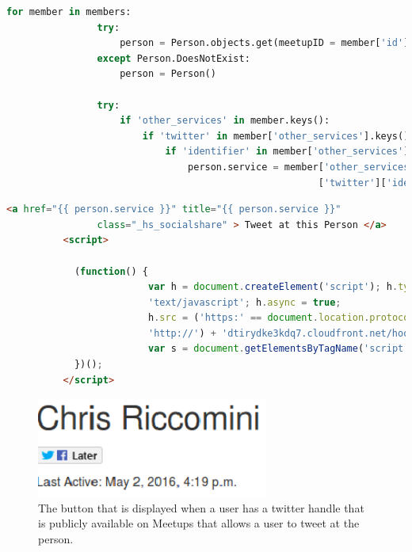 \documentclass[draftclsnofoot,10pt,onecolumn]{IEEEtran} %
\begin{document}
\begin{enumerate}[label*=\arabic*.]
\begin{center}
\begin{lstlisting}[caption=Views.py file where twitter handle is identified and stored, language=Python]
            for member in members:
                try:
                    person = Person.objects.get(meetupID = member['id'])
                except Person.DoesNotExist:
                    person = Person()

                try:        
                    if 'other_services' in member.keys():
                        if 'twitter' in member['other_services'].keys():
                            if 'identifier' in member['other_services']['twitter'].keys():
                                person.service = member['other_services'}
                                                       ['twitter']['identifier']
  \end{lstlisting}
\end{center}
    
  \begin{center}
  \captionsetup{width=.5\linewidth}
   \begin{lstlisting}[caption=View.py where the button for tweeting at a person is created and twitter handle is displayed., language=HTML]
        <a href="{{ person.service }}" title="{{ person.service }}" 
        		class="_hs_socialshare" > Tweet at this Person </a>
          <script>
            
            (function() {
                         var h = document.createElement('script'); h.type = 
                         'text/javascript'; h.async = true;
                         h.src = ('https:' == document.location.protocol ? 'https://' : 
                         'http://') + 'dtirydke3kdq7.cloudfront.net/hootlet.js?v=1';
                         var s = document.getElementsByTagName('script')[0]; s.parentNode.insertBefore(h, s);
            })();
          </script>
   \end{lstlisting}
\end{center}

\newpage

\begin{figure}[H]
  \begin{center}
  \includegraphics[width=3in, frame]{tweet_person1}
  	\captionsetup{width=.4\linewidth}
  \centering
  \caption{The button that is displayed when a user has a twitter handle that is publicly available on Meetups that allows a user to tweet at the person.}


\end{center}
\end{figure}
\end{enumerate}
\end{document}
